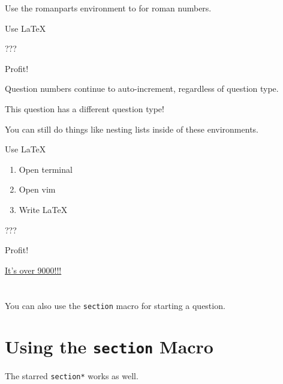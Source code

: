\documentclass[11pt]{homework}
\begin{document}
\question
  Use the romanparts environment to for roman numbers.
  \begin{romanparts}
    \item
      Use \LaTeX

      \lipsum[8]
    \item ???
    \item Profit!
  \end{romanparts}

\question
  Question numbers continue to auto-increment, regardless of question type.

  \lipsum[4]

\renewcommand{\questiontype}{Task}
\question
  This question has a different question type!

  \lipsum[5]

\renewcommand{\questiontype}{Question}

\question
  You can still do things like nesting lists inside of these environments.
  \begin{alphaparts}
    \item Use \LaTeX
      \begin{enumerate}
        \item Open terminal
        \item Open vim
        \item Write LaTeX
      \end{enumerate}
    \item ???
    \item Profit!
  \end{alphaparts}

  \lipsum[9]

\setcounter{questionCounter}{9000}
\question
  \href{https://www.youtube.com/watch?v=SiMHTK15Pik}{It's over 9000!!!}

  \lipsum[6]


\section{}
  You can also use the \texttt{section} macro for starting a question.

  \lipsum[10]

\section*{Using the \texttt{section} Macro}
  The starred \texttt{section*} works as well.

  \lipsum[11]
\end{document}
